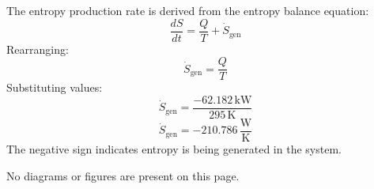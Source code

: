 The entropy production rate is derived from the entropy balance equation:  
\[
\frac{dS}{dt} = \frac{Q}{T} + \dot{S}_\text{gen}
\]  
Rearranging:  
\[
\dot{S}_\text{gen} = \frac{Q}{T}
\]  
Substituting values:  
\[
\dot{S}_\text{gen} = \frac{-62.182 \, \text{kW}}{295 \, \text{K}}
\]  
\[
\dot{S}_\text{gen} = -210.786 \, \frac{\text{W}}{\text{K}}
\]  
The negative sign indicates entropy is being generated in the system.  

No diagrams or figures are present on this page.